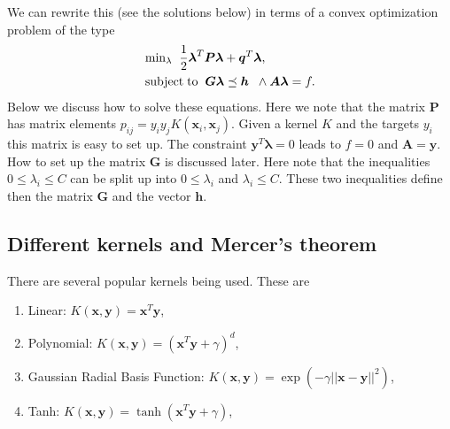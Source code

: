 \documentclass[letterpaper,10pt,english]{sphinxmanual}
\begin{document}
We can rewrite this (see the solutions below) in terms of a convex optimization problem of the type
\begin{equation*}
\begin{split}
\begin{align*}
    &\mathrm{min}_{\lambda}\hspace{0.2cm} \frac{1}{2}\boldsymbol{\lambda}^T\boldsymbol{P}\boldsymbol{\lambda}+\boldsymbol{q}^T\boldsymbol{\lambda},\\ \nonumber
    &\mathrm{subject\hspace{0.1cm}to} \hspace{0.2cm} \boldsymbol{G}\boldsymbol{\lambda} \preceq \boldsymbol{h} \hspace{0.2cm} \wedge \boldsymbol{A}\boldsymbol{\lambda}=f.
\end{align*}
\end{split}
\end{equation*}
Below we discuss how to solve these equations. Here we note that the matrix \(\boldsymbol{P}\) has matrix elements \(p_{ij}=y_iy_jK(\boldsymbol{x}_i,\boldsymbol{x}_j)\).
Given a kernel \(K\) and the targets \(y_i\) this matrix is easy to set up. The constraint \(\boldsymbol{y}^T\boldsymbol{\lambda}=0\) leads to \(f=0\) and \(\boldsymbol{A}=\boldsymbol{y}\). How to set up the matrix \(\boldsymbol{G}\) is discussed later. Here note that the inequalities \(0\leq \lambda_i \leq C\) can be split up into
\(0\leq \lambda_i\) and \(\lambda_i \leq C\). These two inequalities define then the matrix \(\boldsymbol{G}\) and the vector \(\boldsymbol{h}\).


\subsection{Different kernels and Mercer’s theorem}
\label{\detokenize{chapter7:different-kernels-and-mercer-s-theorem}}
There are several popular kernels being used. These are
\begin{enumerate}
%
\item {} 
Linear: \(K(\boldsymbol{x},\boldsymbol{y})=\boldsymbol{x}^T\boldsymbol{y}\),

\item {} 
Polynomial: \(K(\boldsymbol{x},\boldsymbol{y})=(\boldsymbol{x}^T\boldsymbol{y}+\gamma)^d\),

\item {} 
Gaussian Radial Basis Function: \(K(\boldsymbol{x},\boldsymbol{y})=\exp{\left(-\gamma\vert\vert\boldsymbol{x}-\boldsymbol{y}\vert\vert^2\right)}\),

\item {} 
Tanh: \(K(\boldsymbol{x},\boldsymbol{y})=\tanh{(\boldsymbol{x}^T\boldsymbol{y}+\gamma)}\),

\end{enumerate}
\end{document}

